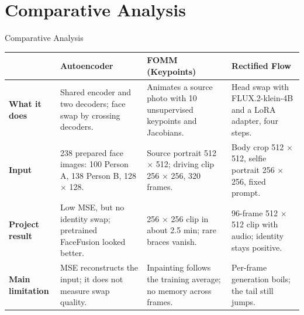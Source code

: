 \section{Comparative Analysis}

\begin{frame}{Comparative Analysis}
    \centering
    \scriptsize
    \setlength{\tabcolsep}{4pt}
    \renewcommand{\arraystretch}{1.3}
    \begin{tabular}{@{}p{} p{} p{} p{}@{}}
        \toprule
        & \textbf{Autoencoder} & \textbf{FOMM (Keypoints)} & \textbf{Rectified Flow} \\
        \midrule
        \textbf{What it does}
        & Shared encoder and two decoders; face swap by crossing decoders.
        & Animates a source photo with 10 unsupervised keypoints and Jacobians.
        & Head swap with FLUX.2-klein-4B and a LoRA adapter, four steps. \\
        \addlinespace
        \textbf{Input}
        & 238 prepared face images: 100 Person A, 138 Person B, 128 $\times$ 128.
        & Source portrait 512 $\times$ 512; driving clip 256 $\times$ 256, 320 frames.
        & Body crop 512 $\times$ 512, selfie portrait 256 $\times$ 256, fixed prompt. \\
        \addlinespace
        \textbf{Project result}
        & Low MSE, but no identity swap; pretrained FaceFusion looked better.
        & 256 $\times$ 256 clip in about 2.5 min; rare braces vanish.
        & 96-frame 512 $\times$ 512 clip with audio; identity stays positive. \\
        \addlinespace
        \textbf{Main limitation}
        & MSE reconstructs the input; it does not measure swap quality.
        & Inpainting follows the training average; no memory across frames.
        & Per-frame generation boils; the tail still jumps. \\
        \bottomrule
    \end{tabular}
\end{frame}
